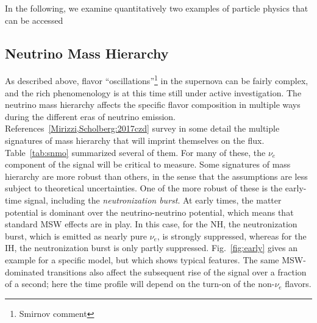 
In the following, we examine quantitatively two examples of particle
physics that can be accessed 

\subsection{Neutrino Mass Hierarchy}


As described above, flavor ``oscillations''\footnote{Smirnov comment}
in the supernova can be fairly complex, and the rich phenomenology is
at this time still under active investigation.  The neutrino mass
hierarchy affects the specific flavor composition in multiple ways
during the different eras of neutrino emission.  
References~\ref{Mirizzi,Scholberg:2017czd} survey in some detail the
multiple signatures of mass hierarchy that will imprint themselves on
the flux.  Table~\ref{tab:snmo} summarized several of them. For many of these, the $\nu_e$ component of the signal will
be critical to measure.    Some signatures of mass hierarchy are more robust than
others, in the sense that the assumptions are less subject to
theoretical uncertainties.  One of the more robust of these is the
early-time signal, including the \textit{neutronization burst}.   At
early times, the matter potential is dominant over the
neutrino-neutrino potential, which means that standard MSW effects are
in play.  In this case, for the NH, the neutronization burst, which is
emitted as nearly pure $\nu_e$, is strongly suppressed, whereas for
the IH, the neutronization burst is only partly suppressed.  
Fig.~\ref{fig:early} gives an example for a specific model, but which
shows typical features.  The same MSW-dominated transitions also
affect
the subsequent rise of the signal over a fraction of a second; here
the time profile will depend on the turn-on of the non-$\nu_e$ flavors.

